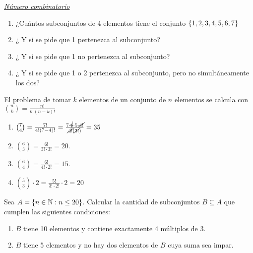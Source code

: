 
\separador

{\it \underline{Número combinatorio}}

\ejercicio

\begin{enumerate}[label=\roman*)]
	\item ¿Cuántos subconjuntos de 4 elementos tiene el conjunto $\set{\foreach \i in {1,...,6}{ \i, }7} $
	\item ¿ Y si se pide que 1 pertenezca al subconjunto?
	\item ¿ Y si se pide que 1 no pertenezca al subconjunto?
	\item ¿ Y si se pide que 1 o 2 pertenezca al subconjunto, pero no simultáneamente los dos?
\end{enumerate}

\separadorCorto

El problema de tomar $k$ elementos de un conjunto de $n$ elementos se calcula con $\binom{n}{k} = \frac{n!}{k!(n-k)!}$

\begin{enumerate}[label=\roman*)]
	\item  $\binom{7}{4} = \frac{7!}{4!(7-4)!} = \frac{7\cdot \cancel{6} \cdot 5 \cdot \cancel{4!}}{\cancel{4!}(\cancel{3!})} = 35$

	\item $\binom{6}{3} = \frac{6!}{3!\cdot 3!} = 20$.

	\item $\binom{6}{4} = \frac{6!}{4!\cdot 2!} = 15$.

	\item $\binom{5}{3} \cdot 2 = \frac{5!}{3!\cdot 2!} \cdot 2 = 20$
\end{enumerate}

\ejercicio
Sea $A = \left\{ n \in \mathbb N : n \leq 20 \right\}$. Calcular la cantidad de subconjuntos $B \subseteq A$ que cumplen las siguientes condiciones:
\begin{enumerate}[label=\roman*)]
	\item $B$ tiene 10 elementos y contiene exactamente 4 múltiplos de 3.
	\item $B$ tiene 5 elementos y no hay dos elementos de $B$ cuya suma sea impar.
\end{enumerate}

\separadorCorto

